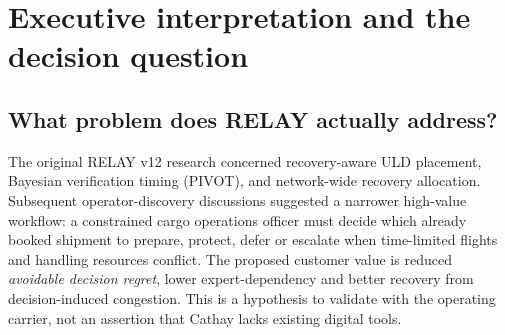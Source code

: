 \documentclass[10pt,a4paper]{article}
\theoremstyle{definition}\newtheorem{definition}[theorem]{Definition}
\theoremstyle{remark}\newtheorem{remark}[theorem]{Remark}
\newcommand{\1}{\mathbbm 1}
\begin{document}
\begin{abstract}
Air-cargo departure decisions couple confirmed service commitments, immutable flight eligibility, specialized handling, finite ground resources, regulatory conditions, imperfect information and irreversible cutoffs. RELAY aims to augment rather than displace expert judgement. We consolidate the original recovery-oriented v12 mathematical models, the operational pivot, the v13 restricted snake-graph correspondence, and the executable v17 event-driven simulator. We distinguish implemented guarantees, mathematical results proved under narrow hypotheses, and aspirational stochastic optimization. We develop an exact, timestamp-based \emph{physical staging occupancy} KPI and a separate \emph{end-to-end local demand pressure} KPI, recover them algebraically from archived integrals, and evaluate all four simulated operator roles across 10,240 paired synthetic worlds (40,960 replays). Time-averaged staging occupancy is 56.07\% for a novice acting manually, 54.73\% for an assisted novice, 55.00\% for a manual senior and 54.62\% for an assisted senior. Corresponding capacity-normalized total demand pressure is 64.35\%, 60.96\%, 61.51\% and 60.69\%. The fraction of worlds ever experiencing instantaneous total demand above staging capacity is 51.20\%, 47.68\%, 48.37\% and 47.26\%, respectively. These are causal outputs \emph{within the stipulated simulator} but not empirical estimates for Cathay, whose decision-maker behaviour, real-time capacity and disruption frequencies have not been identified. We identify implementation gaps, statistical non-identifiability, commercial opportunities and a validation-gated pilot programme.
\end{abstract}
\tableofcontents
\clearpage
{}

\section{Executive interpretation and the decision question}
\subsection{What problem does RELAY actually address?}
The original RELAY v12 research concerned recovery-aware ULD placement, Bayesian verification timing (PIVOT), and network-wide recovery allocation. Subsequent operator-discovery discussions suggested a narrower high-value workflow: a constrained cargo operations officer must decide which already booked shipment to prepare, protect, defer or escalate when time-limited flights and handling resources conflict. The proposed customer value is reduced \emph{avoidable decision regret}, lower expert-dependency and better recovery from decision-induced congestion. This is a hypothesis to validate with the operating carrier, not an assertion that Cathay lacks existing digital tools.
\end{document}
